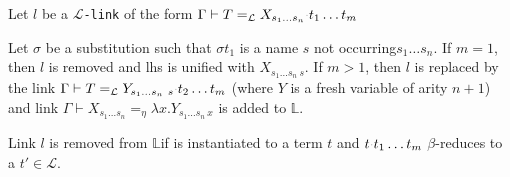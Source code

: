 \documentclass[sigconf,natbib=false,review]{acmart}
\newcommand{\appsep}{\ensuremath{\textcolor{lightgray}{\cdot}}}
\newcommand{\llambda}{\ensuremath{\mathcal{L}}\xspace}
\newcommand{\linkMacro}[1]{\ensuremath{#1}\texttt{-link}\xspace}
\newcommand{\linkbeta}{\linkMacro{\llambda}}
\newcommand{\linketaM}[3]{\ensuremath{#1 \vdash #2 =_\eta #3}}
\newcommand{\linkbetaM}[3]{\ensuremath{#1 \vdash #2 =_{\llambda} #3}}
\newcommand{\lhs}{lhs\xspace}
\newcommand{\rhs}{rhs\xspace}
\newcommand{\linkStore}{\texorpdfstring{\ensuremath{\mathbb{L}}\xspace}{L}}
\begin{document}
Let $l$ be a \linkbeta of the form \linkbetaM{\Gamma}{T}{\rhsBeta}

\begin{definition}[\progBetaLL]
  Let $\sigma$ be a substitution such that $\sigma t_1$ is a name $s$
  not occurring$s_1\dots s_n$. If $m = 1$, then $l$ is removed and \lhs is
  unified with $X_{s_1\ldots s_n~s}$.
  If $m > 1$, then $l$ is replaced by the link
  $\linkbetaM{\Gamma}{T}{Y_{s_1\dots s_n~s}\appsep t_2\dots t_m}$
  (where $Y$ is a fresh variable of arity $n+1$) and link
  \linketaM{\Gamma}{X_{s_1\dots s_n}}{\lambda x.Y_{s_1\dots s_n~x}}
  is added to \linkStore.   
  \label{def:progBetaLL}
\end{definition}

\begin{definition}[\progBetaRH]
  Link $l$ is removed from
  \linkStore if \rhsBetaHead is instantiated to a term $t$ and
  $t \appsep t_1 \ldots t_m$ $\beta$-reduces to a $t' \in \llambda$.
  \label{def:progBetaRH}
\end{definition}
\end{document}
